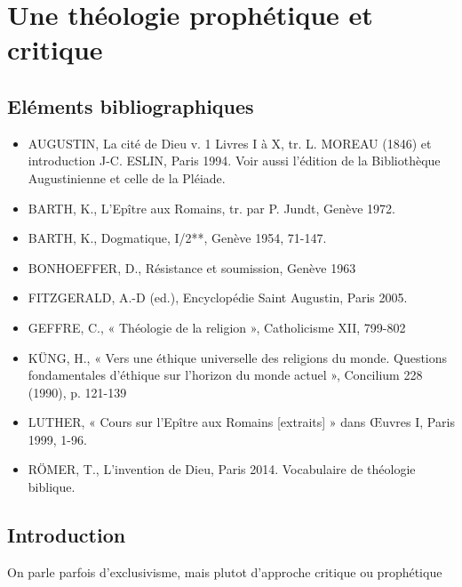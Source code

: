 \chapter{Une théologie prophétique et critique}
\section{Eléments bibliographiques}

\begin{itemize}
    \item AUGUSTIN, La cité de Dieu v. 1 Livres I à X, tr. L. MOREAU (1846) et introduction J-C. ESLIN, Paris 1994. Voir aussi l’édition de la Bibliothèque Augustinienne et celle de la
Pléiade.
    \item BARTH, K., L’Epître aux Romains, tr. par P. Jundt, Genève 1972.
    \item BARTH, K., Dogmatique, I/2**, Genève 1954, 71-147.
    \item BONHOEFFER, D., Résistance et soumission, Genève 1963
    \item FITZGERALD, A.-D (ed.), Encyclopédie Saint Augustin, Paris 2005.
    \item GEFFRE, C., « Théologie de la religion », Catholicisme XII, 799-802
    \item KÜNG, H., « Vers une éthique universelle des religions du monde. Questions fondamentales
d’éthique sur l’horizon du monde actuel », Concilium 228 (1990), p. 121-139
    \item LUTHER, « Cours sur l’Epître aux Romains [extraits] » dans Œuvres I, Paris 1999, 1-96.
    \item RÖMER, T., L’invention de Dieu, Paris 2014.
Vocabulaire de théologie biblique.

\end{itemize}






\section{Introduction}



  \begin{Def}[Exclusivisme]
 On parle parfois d'exclusivisme, 
 mais plutot d'approche critique ou prophétique
\end{Def}
 
